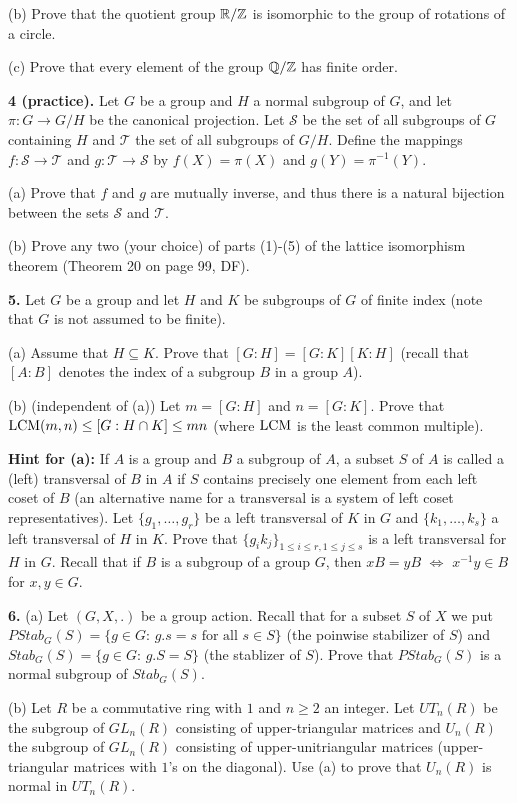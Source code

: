 \documentclass[12pt]{article}
\begin{document}
(b) Prove that the quotient group ${\mathbb R}/{\mathbb Z}$ is isomorphic to the group
of rotations of a circle.

(c) Prove that every element of the group ${\mathbb Q}/{\mathbb Z}$ has finite order.
\skv

{\bf 4 (practice).} Let $G$ be a group and $H$ a normal subgroup of $G$, and let
$\pi: G\to G/H$ be the canonical projection. Let $\mathcal S$
be the set of all subgroups of $G$ containing $H$ and $\mathcal T$
the set of all subgroups of $G/H$. Define the mappings $f: \mathcal S\to \mathcal T$
and $g: \mathcal T\to \mathcal S$ by $f(X)=\pi(X)$ and $g(Y)=\pi^{-1}(Y)$.

(a) Prove that $f$ and $g$ are mutually inverse, and thus there is a natural
bijection between the sets $\mathcal S$ and $\mathcal T$.

(b) Prove any two (your choice) of parts (1)-(5) of the lattice isomorphism theorem
(Theorem 20 on page 99, DF).
\skv

{\bf 5.} Let $G$ be a group and let $H$ and $K$ be subgroups of $G$ of finite index
(note that $G$ is not assumed to be finite).

(a) Assume that $H\subseteq K$. Prove that $[G:H]=[G:K][K:H]$ (recall that $[A:B]$
denotes the index of a subgroup $B$ in a group $A$).

(b) (independent of (a)) Let $m=[G:H]$ and $n=[G:K]$. Prove that
${\rm LCM}(m,n)\leq [G:H\cap K]\leq  mn$ (where ${\rm LCM}$ is the least common multiple).

{\bf Hint for (a):} If $A$ is a group and $B$ a subgroup of $A$, a
subset $S$ of $A$ is called a (left) transversal of $B$ in $A$
if $S$ contains precisely one element from each left coset of $B$
(an alternative name for a transversal is a system of left coset representatives).
Let $\{g_1,\ldots, g_r\}$ be a left transversal of $K$ in $G$
and $\{k_1,\ldots, k_s\}$ a left transversal of $H$ in $K$. Prove
that $\{g_i k_j\}_{1\leq i\leq r, 1\leq j\leq s}$ is a left transversal for $H$ in $G$.
Recall that if $B$ is a subgroup of a group $G$, then $xB=yB$ $\iff$ $x^{-1}y\in B$
for $x,y\in G$.


\skv
{\bf 6.} (a) Let $(G,X,.)$ be a group action. Recall that for a subset $S$ of $X$
we put
$PStab_G(S)=\{g\in G:\, g . s=s\mbox{ for all }s\in S\}$ (the poinwise stabilizer of $S$) and 
$Stab_G(S)=\{g\in G:\, g. S=S\}$ (the stablizer of $S$). 
Prove that $PStab_G(S)$ is a normal subgroup of $Stab_G(S)$.

(b) Let $R$ be a commutative ring with $1$ and $n\geq 2$ an integer.
Let $UT_{n}(R)$ be the subgroup of $GL_n(R)$ consisting of upper-triangular
matrices and $U_{n}(R)$ the subgroup of $GL_n(R)$ consisting of upper-unitriangular
matrices (upper-triangular matrices with $1$'s on the diagonal). Use (a) to
prove that $U_{n}(R)$ is normal in $UT_{n}(R)$.
\end{document}
